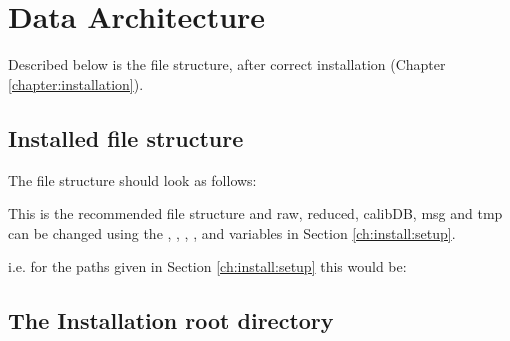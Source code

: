 \chapter{Data Architecture}
\label{ch:data_architecture}

Described below is the file structure, after correct installation (Chapter \ref{chapter:installation}).


\section{Installed file structure}
\label{ch:data_architecture:folder_layout}

The file structure should look as follows:
\begin{tcustomdir}
\vspace{0.5cm}
\noindent * This is the recommended file structure and raw, reduced, calibDB, msg and tmp can be changed using the , , , , and  variables in Section \ref{ch:install:setup}.
\end{tcustomdir}

\noindent i.e. for the paths given in Section \ref{ch:install:setup} this would be:
\begin{tcustomdir}
\end{tcustomdir}



\section{The Installation root directory}
\label{ch:data_architecture:install_root_folder}


